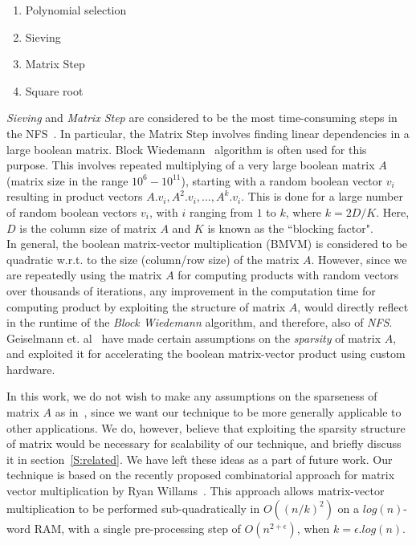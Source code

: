\documentclass[conference, 9pt]{IEEEtran}
\begin{document}
\begin{enumerate}
	\item Polynomial selection
	\item Sieving
	\item Matrix Step
	\item Square root 
\end{enumerate}  

\emph{Sieving} and \emph{Matrix Step} are considered to be the most time-consuming steps in the
NFS~\cite{anand2007factoring}. In particular, the Matrix Step involves finding linear dependencies
in a large boolean matrix. Block Wiedemann~\cite{coppersmith1994solving} algorithm is often used for
this purpose. This involves repeated multiplying of a very large boolean matrix $A$ (matrix size in
the range $10^{6}-10^{11}$), starting with a random boolean vector $v_{i}$ resulting in product
vectors $A . v_{i}, A^{2} . v_{i}, ... , A^{k} . v_{i}$.
This is done for a large number of random boolean vectors $v_{i}$, with $i$ ranging from $1$ to $k$,
where $k = 2D/K$. Here, $D$ is the column size of matrix $A$ and $K$ is known as the ``blocking
factor". \\

In general, the boolean matrix-vector multiplication (BMVM) is considered to be quadratic w.r.t. to
the size (column/row size) of the matrix $A$. However, since we are repeatedly using the matrix $A$
for computing products with random vectors over thousands of iterations, any improvement in the
computation time for computing product by exploiting the structure of matrix $A$, would directly
reflect in the runtime of the \emph{Block Wiedemann} algorithm, and therefore, also of \emph{NFS}.
Geiselmann et. al~\cite{geiselmann2003hardware} have made certain assumptions on the \emph{sparsity}
of matrix $A$, and exploited it for accelerating the boolean matrix-vector product using custom
hardware. 

In this work, we do not wish to make any assumptions on the sparseness of matrix $A$ as
in~\cite{geiselmann2003hardware}, since we want our technique to be more generally applicable to
other applications. We do, however, believe that exploiting the sparsity structure of matrix would
be necessary for scalability of our technique, and briefly discuss it in section~\ref{S:related}. We
have left these ideas as a part of future work. Our technique is based on the recently proposed
combinatorial approach for matrix vector multiplication by Ryan Willams~\cite{williams2007matrix}.
This approach allows matrix-vector multiplication to be performed sub-quadratically in
$O((n/k)^{2})$ on a $log(n)$-word RAM, with a single pre-processing step of $O(n^{2+\epsilon})$,
when $k = \epsilon . log(n)$.\\     
\end{document}
